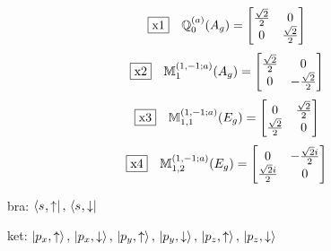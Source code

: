 \documentclass[fleqn,10pt,landscape]{jsarticle}
\begin{document}
\begin{dmath*}
\fbox{x1}\quad \mathbb{Q}_{0}^{(a)}(A_{g})=\begin{bmatrix} \frac{\sqrt{2}}{2} & 0 \\ 0 & \frac{\sqrt{2}}{2} \end{bmatrix}
\end{dmath*}
\begin{dmath*}
\fbox{x2}\quad \mathbb{M}_{1}^{(1,-1;a)}(A_{g})=\begin{bmatrix} \frac{\sqrt{2}}{2} & 0 \\ 0 & - \frac{\sqrt{2}}{2} \end{bmatrix}
\end{dmath*}
\begin{dmath*}
\fbox{x3}\quad \mathbb{M}_{1,1}^{(1,-1;a)}(E_{g})=\begin{bmatrix} 0 & \frac{\sqrt{2}}{2} \\ \frac{\sqrt{2}}{2} & 0 \end{bmatrix}
\end{dmath*}
\begin{dmath*}
\fbox{x4}\quad \mathbb{M}_{1,2}^{(1,-1;a)}(E_{g})=\begin{bmatrix} 0 & - \frac{\sqrt{2} i}{2} \\ \frac{\sqrt{2} i}{2} & 0 \end{bmatrix}
\end{dmath*}
\vspace{5mm}

\noindent\textbullet\, bra: $\bra{s_{},\uparrow},\, \bra{s_{},\downarrow}$

\noindent\textbullet\, ket: $\ket{p_{x},\uparrow},\, \ket{p_{x},\downarrow},\, \ket{p_{y},\uparrow},\, \ket{p_{y},\downarrow},\, \ket{p_{z},\uparrow},\, \ket{p_{z},\downarrow}$
\end{document}
